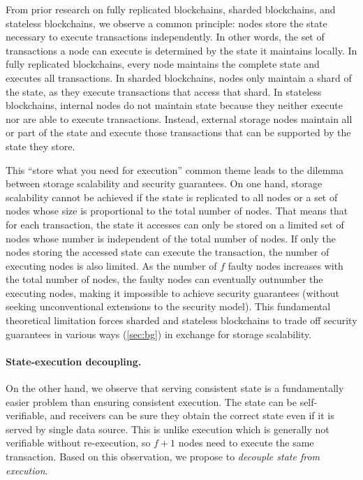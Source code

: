 
From prior research on fully replicated blockchains, sharded blockchains, and stateless blockchains, we observe a common principle: nodes store the state necessary to execute transactions independently.
In other words, the set of transactions a node can execute is determined by the state it maintains locally.
In fully replicated blockchains, every node maintains the complete state and executes all transactions.
In sharded blockchains, nodes only maintain a shard of the state, as they execute transactions that access that shard.
In stateless blockchains, internal nodes do not maintain state because they neither execute nor are able to execute transactions.
Instead, external storage nodes maintain all or part of the state and execute those transactions that can be supported by the state they store.

This ``store what you need for execution'' common theme leads to the dilemma between storage scalability and security guarantees.
On one hand, storage scalability cannot be achieved if the state is replicated to all nodes or a set of nodes whose size is proportional to the total number of nodes.
That means that for each transaction, the state it accesses can only be stored on a limited set of nodes whose number is independent of the total number of nodes.
If only the nodes storing the accessed state can execute the transaction, the number of executing nodes is also limited.
As the number of $f$ faulty nodes increases with the total number of nodes, the faulty nodes can eventually outnumber the executing nodes, making it impossible to achieve security guarantees (without seeking unconventional extensions to the security model).
This fundamental theoretical limitation forces sharded and stateless blockchains to trade off security guarantees in various ways (\autoref{sec:bg}) in exchange for storage scalability.

\paragraph{State-execution decoupling.}
On the other hand, we observe that serving consistent state is a fundamentally easier problem than ensuring consistent execution.
The state can be self-verifiable, and receivers can be sure they obtain the correct state even if it is served by single data source.
This is unlike execution which is generally not verifiable without re-execution, so $f+1$ nodes need to execute the same transaction.
Based on this observation, we propose to \emph{decouple state from execution}.


